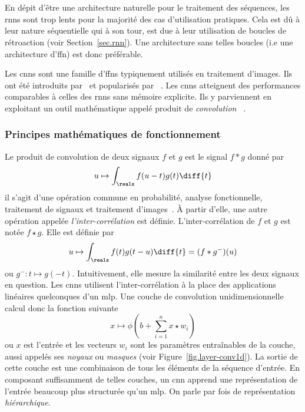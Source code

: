 \section{}
\label{sec.cnn}

En dépit d'être une architecture naturelle pour le traitement des séquences,
les \glspl{rnn} sont trop lents pour la majorité des cas d'utilisation pratiques.
Cela est dû à leur nature séquentielle qui à son tour, 
est due à leur utilisation de boucles de rétroaction (voir Section~\ref{sec.rnn}).
Une architecture sans telles boucles (i.e une architecture d'\gls{ffn}) est donc préférable.

Les \glspl{cnn} sont une famille d'\glspl{ffn} typiquement utilisés en traitement d'images.
Ils ont été introduits par~\cite{Fukushima_1980} et popularisés par%
~\cite{LeCun_Boser_Denker_Henderson_Howard_Hubbard_Jackel_1989,Lecun_Bottou_Bengio_Haffner_1998}.
Les \glspl{cnn} atteignent des performances comparables à celles des \glspl{rnn} sans mémoire explicite.
Ils y parviennent en exploitant un outil mathématique appelé produit de \emph{convolution}%
~\cite{Calin_2020}.

\subsubsection{Principes mathématiques de fonctionnement}

Le produit de convolution de deux signaux \(f\) et \(g\) est le signal \(f \ast g\) donné par
\begin{equation}
    \label{eq.convolution}
    u \mapsto \int_\reals f(u-t)g(t)\diff{t}
\end{equation}
il s'agit d'une opération commune en probabilité, analyse fonctionnelle, 
traitement de signaux et traitement d'images~\cite{Barbe_Ledoux_2012,Oppenheim_Schafer_2013}.
À partir d'elle, une autre opération appelée \emph{l'inter-corrélation} est définie.
L'inter-corrélation de \(f\) et \(g\) est notée \(f\star g\).
Elle est définie par
\begin{equation}
    \label{eq.cros-corr}
    u \mapsto \int_\reals f(t)g(t-u)\diff{t} = (f \ast g^-)(u)
\end{equation}
ou \(g^- : t \mapsto g(-t)\).
Intuitivement, elle mesure la similarité entre les deux signaux en question.
Les \glspl{cnn} utilisent l'inter-corrélation à la place des applications linéaires quelconques d'un \gls{mlp}.
Une couche de convolution unidimensionnelle calcul donc la fonction suivante
\begin{equation}
    \label{eq.layer-conv1d}
    x \mapsto \phi\left(b + \sum_{i=1}^n x\star w_i\right)
\end{equation}
ou \(x\) est l'entrée et les vecteurs \(w_i\) sont les paramètres entraînables de la couche, 
aussi appelés ses \emph{noyaux} ou \emph{masques}
(voir Figure~\ref{fig.layer-conv1d}).
La sortie de cette couche est une combinaison de tous les éléments de la séquence d'entrée.
En composant suffisamment de telles couches,
un \gls{cnn} apprend une représentation de l'entrée beaucoup plus structurée qu'un \gls{mlp}.
On parle par fois de représentation \emph{hiérarchique}.

